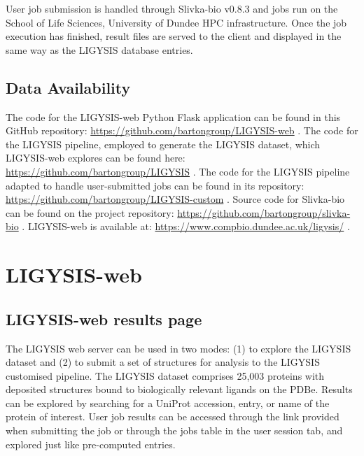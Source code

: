 

User job submission is handled through Slivka-bio v0.8.3 \cite{WAROWNY_2021_SLIVKA, SLIVKA_BIO} and jobs run on the School of Life Sciences, University of Dundee HPC infrastructure. Once the job execution has finished, result files are served to the client and displayed in the same way as the LIGYSIS database entries.

\subsection{Data Availability}

The code for the LIGYSIS-web Python Flask application can be found in this GitHub repository: \url{https://github.com/bartongroup/LIGYSIS-web} \cite{UTGES_2024_LIGYSIS_WEB_ZENODO}. The code for the LIGYSIS pipeline, employed to generate the LIGYSIS dataset, which LIGYSIS-web explores can be found here: \url{https://github.com/bartongroup/LIGYSIS} \cite{UTGES_2024_LIGYSIS_ZENODO}. The code for the LIGYSIS pipeline adapted to handle user-submitted jobs can be found in its repository: \url{https://github.com/bartongroup/LIGYSIS-custom} \cite{UTGES_2024_LIGYSIS_CUSTOM_ZENODO}. Source code for Slivka-bio can be found on the project repository: \url{https://github.com/bartongroup/slivka-bio} \cite{WAROWNY_2025_SLIVKABIO}. LIGYSIS-web is available at: \url{https://www.compbio.dundee.ac.uk/ligysis/} \cite{LIGYSIS_SERVER}.

\section{LIGYSIS-web}

\subsection{LIGYSIS-web results page}

The LIGYSIS web server can be used in two modes: (1) to explore the LIGYSIS dataset and (2) to submit a set of structures for analysis to the LIGYSIS customised pipeline. The LIGYSIS dataset comprises 25,003 proteins with deposited structures bound to biologically relevant ligands on the PDBe. Results can be explored by searching for a UniProt accession, entry, or name of the protein of interest. User job results can be accessed through the link provided when submitting the job or through the jobs table in the user session tab, and explored just like pre-computed entries.


